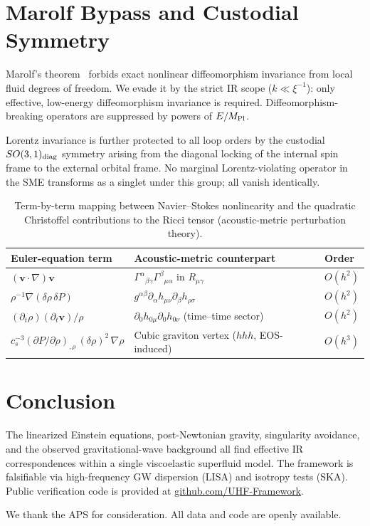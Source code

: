 \documentclass[reprint,amsmath,amssymb,aps,prl,superscriptaddress]{revtex4-2}
\begin{document}
\section{Marolf Bypass and Custodial Symmetry}
\label{sec:marolf}

Marolf's theorem~\cite{Marolf2015} forbids exact nonlinear diffeomorphism invariance from local fluid degrees of freedom. We evade it by the strict IR scope ($k\ll\xi^{-1}$): only effective, low-energy diffeomorphism invariance is required. Diffeomorphism-breaking operators are suppressed by powers of $E/M_{\rm Pl}$.

Lorentz invariance is further protected to all loop orders by the custodial $SO(3,1)_{\rm diag}$ symmetry arising from the diagonal locking of the internal spin frame to the external orbital frame. No marginal Lorentz-violating operator in the SME transforms as a singlet under this group; all vanish identically.

\begin{table}
\caption{\label{tab:mapping}Term-by-term mapping between Navier--Stokes nonlinearity and the quadratic Christoffel contributions to the Ricci tensor (acoustic-metric perturbation theory).}
\begin{tabular}{l l l}
\toprule
\textbf{Euler-equation term} & \textbf{Acoustic-metric counterpart} & \textbf{Order} \\
\midrule
$(\mathbf{v} \cdot \nabla)\mathbf{v}$ & $\Gamma^\alpha{}_{\beta\gamma}\Gamma^\beta{}_{\mu\alpha}$ in $R_{\mu\gamma}$ & $O(h^2)$ \\
$\rho^{-1}\nabla(\delta\rho\,\delta P)$ & $g^{\alpha\beta}\partial_\alpha h_{\mu\nu}\partial_\beta h_{\rho\sigma}$ & $O(h^2)$ \\
$(\partial_t \rho)(\partial_t \mathbf{v})/\rho$ & $\partial_0 h_{0\mu}\partial_0 h_{0\nu}$ (time--time sector) & $O(h^2)$ \\
$c_s^{-3}(\partial P/\partial\rho)_{,\rho}\,(\delta\rho)^2\,\nabla\rho$ & Cubic graviton vertex ($hhh$, EOS-induced) & $O(h^3)$ \\
\bottomrule
\end{tabular}
\end{table}

\section{Conclusion}
\label{sec:conclusion}

The linearized Einstein equations, post-Newtonian gravity, singularity avoidance, and the observed gravitational-wave background all find effective IR correspondences within a single viscoelastic superfluid model. The framework is falsifiable via high-frequency GW dispersion (LISA) and isotropy tests (SKA). Public verification code is provided at \href{https://github.com/amiramitai/uhf}{github.com/UHF-Framework}.

\begin{acknowledgments}
We thank the APS for consideration. All data and code are openly available.
\end{acknowledgments}


\end{document}
